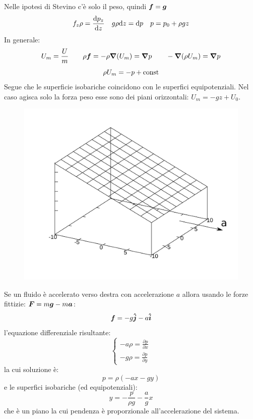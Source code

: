 \begin{Es}
   Nelle ipotesi di Stevino c'è solo il peso, quindi $\boldsymbol{f}=\boldsymbol{g}$
   \[
      f_z\rho=\frac{\mathrm{d} p_z}{\mathrm{d} z}\quad g\rho\mathrm{d} z=\mathrm{d} p \quad p=p_0+\rho gz
   \]
   In generale:
   \[U_m=\frac{U}{m}\qquad \rho\boldsymbol{f}=-\rho\boldsymbol{\nabla}(U_m)=\boldsymbol{\nabla} p\qquad -\boldsymbol{\nabla}(\rho U_m)=\boldsymbol{\nabla} p\]
   \[\rho U_m=-p+\text{const}\]
   Segue che le superficie isobariche coincidono con le superfici equipotenziali. Nel caso agisca solo la forza peso esse sono dei piani orizzontali: $U_m = -gz+U_0$.
\end{Es}
\begin{Es}
   \begin{figure}[htbp]
      \centering
      \includegraphics[scale=0.5]{immagini/fisica1/fluido_accelerato}
   \end{figure}
   Se un fluido è accelerato verso destra con accelerazione $a$ allora usando le forze fittizie: $\boldsymbol{F}=m\boldsymbol{g}-m\boldsymbol{a}$:
   \[
      \boldsymbol{f} = -g\boldsymbol{\hat {j}} - a \boldsymbol{\hat {i}}
   \]
   l'equazione differenziale risultante:
   \[
      \begin{cases}
         -a\rho=\frac{\partial p}{\partial x} \\
         -g\rho=\frac{\partial p}{\partial y}
      \end{cases}
   \]
   la cui soluzione è:
   \[
      p = \rho(-ax-gy)
   \]
   e le superfici isobariche (ed equipotenziali):
   \[
      y = -\frac{p}{\rho g} - \frac{a}{g}x
   \]
   che è un piano la cui pendenza è proporzionale all'accelerazione del sistema.
\end{Es}
